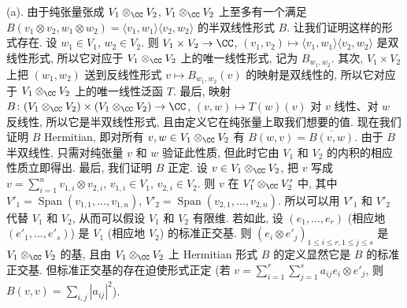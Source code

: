 \begin{solution}
(a). 由于纯张量张成 $V_1 \otimes_{\CC}V_2$, $V_1 \otimes_{\CC}V_2$ 上至多有一个满足 $B(v_1 \otimes v_2, w_1 \otimes w_2) = \langle v_1, w_1 \rangle\langle v_2, w_2 \rangle$ 的半双线性形式 $B$. 让我们证明这样的形式存在. 设 $w_1 \in V_1$, $w_2 \in V_2$. 则 $V_1 \times V_2 \to \CC$, $(v_1, v_2) \longmapsto \langle v_1, w_1 \rangle\langle v_2, w_2 \rangle$ 是双线性形式, 所以它对应于 $V_1 \otimes_{\CC}V_2$ 上的唯一线性形式, 记为 $B_{w_1,w_2}$. 其次, $V_1 \times V_2$ 上把 $(w_1, w_2)$ 送到反线性形式 $v \longmapsto B_{w_1,w_2}(v)$ 的映射是双线性的, 所以它对应于 $V_1 \otimes_{\CC}V_2$ 上的唯一线性泛函 $T$. 最后, 映射 $B \colon (V_1 \otimes_{\CC}V_2) \times (V_1 \otimes_{\CC}V_2) \to \CC$, $(v, w) \longmapsto T(w)(v)$ 对 $v$ 线性、对 $w$ 反线性, 所以它是半双线性形式, 且由定义它在纯张量上取我们想要的值.
现在我们证明 $B$ Hermitian, 即对所有 $v, w \in V_1 \otimes_{\CC}V_2$ 有 $B(w, v) = \overline{B(v, w)}$. 由于 $B$ 半双线性, 只需对纯张量 $v$ 和 $w$ 验证此性质, 但此时它由 $V_1$ 和 $V_2$ 的内积的相应性质立即得出.
最后, 我们证明 $B$ 正定. 设 $v \in V_1 \otimes_{\CC}V_2$, 把 $v$ 写成 $v = \sum_{i=1}^n v_{1,i} \otimes v_{2,i}$, $v_{1,i} \in V_1$, $v_{2,i} \in V_2$. 则 $v$ 在 $V'_1 \otimes_{\CC}V'_2$ 中, 其中 $V'_1 = \operatorname{Span}(v_{1,1}, \ldots, v_{1,n})$, $V'_2 = \operatorname{Span}(v_{2,1}, \ldots, v_{2,n})$. 所以可以用 $V'_1$ 和 $V'_2$ 代替 $V_1$ 和 $V_2$, 从而可以假设 $V_1$ 和 $V_2$ 有限维. 若如此, 设 $(e_1, \ldots, e_r)$ (相应地 $(e'_1, \ldots, e'_s)$) 是 $V_1$ (相应地 $V_2$) 的标准正交基. 则 $(e_i \otimes e'_j)_{1 \leq i \leq r, 1 \leq j \leq s}$ 是 $V_1 \otimes_{\CC}V_2$ 的基, 且由 $V_1 \otimes_{\CC}V_2$ 上 Hermitian 形式 $B$ 的定义显然它是 $B$ 的标准正交基. 但标准正交基的存在迫使形式正定 (若 $v = \sum_{i=1}^r\sum_{j=1}^s a_{ij}e_i \otimes e'_j$, 则 $B(v, v) = \sum_{i,j}|a_{ij}|^2$).


\end{solution}
